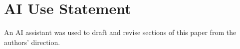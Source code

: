 \section*{AI Use Statement}

An AI assistant was used to draft and revise sections of this paper from the
authors' direction.
